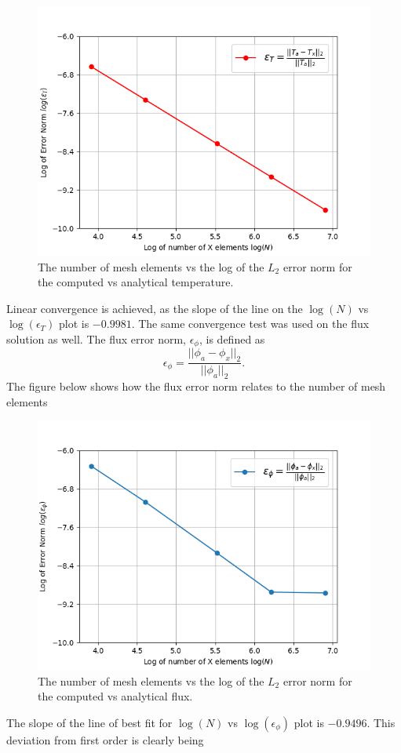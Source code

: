 \documentclass[letterpaper]{mc2023}
\begin{document}
\begin{figure}[H]
    \centering
    \includegraphics[width=0.65\linewidth]{figures/temp_error_norms.png}
    \caption{The number of mesh elements vs the log of the $L_{2}$ error norm for the computed vs analytical temperature.}
    \label{fig:temp_error_study}
\end{figure}
Linear convergence is achieved, as the slope of the line on the $\log(N)$ vs $\log(\epsilon_{T})$ plot is $-0.9981$. The same convergence test
was used on the flux solution as well. The flux error norm, $\epsilon_{\phi}$, is defined as
\begin{equation}
    \epsilon_{\phi} =  \frac{|| \phi_{a} - \phi_{x} ||_{2}}{|| \phi_{a} ||_{2}}.
\end{equation}
The figure below shows how the flux error norm relates to the number of mesh elements
\begin{figure}[H]
    \centering
    \includegraphics[width=0.65\linewidth]{figures/flux_error_norms.png}
    \caption{The number of mesh elements vs the log of the $L_{2}$ error norm for the computed vs analytical flux.}
    \label{fig:flux_error_study}
\end{figure}
The slope of the line of best fit for $\log(N)$ vs $\log(\epsilon_{\phi})$ plot is $-0.9496$. This deviation from first order is clearly being
\end{document}
